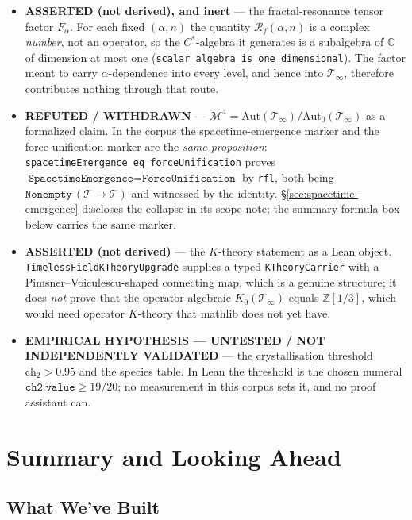 \begin{itemize}
\item \textbf{ASSERTED (not derived), and inert} --- the fractal-resonance
tensor factor $F_\alpha$. For each fixed $(\alpha, n)$ the quantity
$\mathcal{R}_f(\alpha,n)$ is a complex \emph{number}, not an operator, so the
$C^*$-algebra it generates is a subalgebra of $\mathbb{C}$ of dimension at most
one (\texttt{scalar\_algebra\_is\_one\_dimensional}). The factor meant to carry
$\alpha$-dependence into every level, and hence into $\mathcal{T}_\infty$,
therefore contributes nothing through that route.

\item \textbf{REFUTED / WITHDRAWN} --- $\mathcal{M}^4 =
\mathrm{Aut}(\mathcal{T}_\infty)/\mathrm{Aut}_0(\mathcal{T}_\infty)$ as a
formalized claim. In the corpus the spacetime-emergence marker and the
force-unification marker are the \emph{same proposition}:
\texttt{spacetimeEmergence\_eq\_forceUnification} proves
$\texttt{SpacetimeEmergence} = \texttt{ForceUnification}$ by \texttt{rfl}, both
being $\texttt{Nonempty}\,(\mathcal{T} \to \mathcal{T})$ and witnessed by the
identity. \S\ref{sec:spacetime-emergence} discloses the collapse in its scope
note; the summary formula box below carries the same marker.

\item \textbf{ASSERTED (not derived)} --- the $K$-theory statement as a Lean
object. \texttt{TimelessFieldKTheoryUpgrade} supplies a typed
\texttt{KTheoryCarrier} with a Pimsner--Voiculescu-shaped connecting map, which
is a genuine structure; it does \emph{not} prove that the operator-algebraic
$K_0(\mathcal{T}_\infty)$ equals $\mathbb{Z}[1/3]$, which would need
operator $K$-theory that mathlib does not yet have.

\item \textbf{EMPIRICAL HYPOTHESIS --- UNTESTED / NOT INDEPENDENTLY
VALIDATED} --- the crystallisation threshold $\mathrm{ch}_2 > 0.95$ and the
species table. In Lean the threshold is the chosen numeral
$\texttt{ch2.value} \ge 19/20$; no measurement in this corpus sets it, and no
proof assistant can.

\end{itemize}

\section{Summary and Looking Ahead}
\label{sec:summary}

\subsection{What We've Built}

